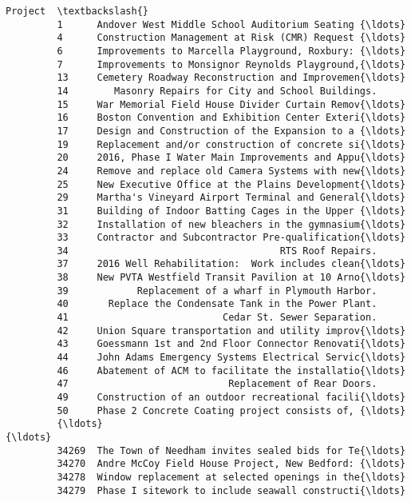 \documentclass[11pt]{article}
\begin{document}
\begin{Verbatim}[commandchars=\\\{\}]
                                                          Project  \textbackslash{}
         1      Andover West Middle School Auditorium Seating {\ldots}   
         4      Construction Management at Risk (CMR) Request {\ldots}   
         6      Improvements to Marcella Playground, Roxbury: {\ldots}   
         7      Improvements to Monsignor Reynolds Playground,{\ldots}   
         13     Cemetery Roadway Reconstruction and Improvemen{\ldots}   
         14        Masonry Repairs for City and School Buildings.   
         15     War Memorial Field House Divider Curtain Remov{\ldots}   
         16     Boston Convention and Exhibition Center Exteri{\ldots}   
         17     Design and Construction of the Expansion to a {\ldots}   
         19     Replacement and/or construction of concrete si{\ldots}   
         20     2016, Phase I Water Main Improvements and Appu{\ldots}   
         24     Remove and replace old Camera Systems with new{\ldots}   
         25     New Executive Office at the Plains Development{\ldots}   
         29     Martha's Vineyard Airport Terminal and General{\ldots}   
         31     Building of Indoor Batting Cages in the Upper {\ldots}   
         32     Installation of new bleachers in the gymnasium{\ldots}   
         33     Contractor and Subcontractor Pre-qualification{\ldots}   
         34                                     RTS Roof Repairs.   
         37     2016 Well Rehabilitation:  Work includes clean{\ldots}   
         38     New PVTA Westfield Transit Pavilion at 10 Arno{\ldots}   
         39            Replacement of a wharf in Plymouth Harbor.   
         40       Replace the Condensate Tank in the Power Plant.   
         41                           Cedar St. Sewer Separation.   
         42     Union Square transportation and utility improv{\ldots}   
         43     Goessmann 1st and 2nd Floor Connector Renovati{\ldots}   
         44     John Adams Emergency Systems Electrical Servic{\ldots}   
         46     Abatement of ACM to facilitate the installatio{\ldots}   
         47                            Replacement of Rear Doors.   
         49     Construction of an outdoor recreational facili{\ldots}   
         50     Phase 2 Concrete Coating project consists of, {\ldots}   
         {\ldots}                                                  {\ldots}   
         34269  The Town of Needham invites sealed bids for Te{\ldots}   
         34270  Andre McCoy Field House Project, New Bedford: {\ldots}   
         34278  Window replacement at selected openings in the{\ldots}   
         34279  Phase I sitework to include seawall constructi{\ldots}   

\end{Verbatim}
\end{document}
